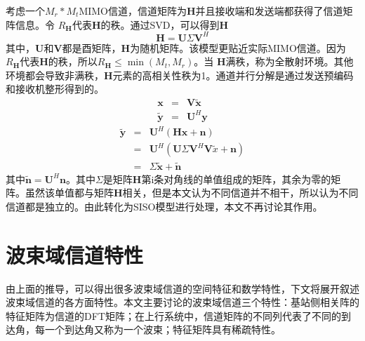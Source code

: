 \documentclass[bachelor,nocolorlinks, printoneside]{seuthesis} %
\begin{document}
\begin{Main}
考虑一个$ M_{r}* M_{t}$MIMO信道，信道矩阵为$\mathbf{H}$并且接收端和发送端都获得了信道矩阵信息。令 $ R_{\mathbf{H}}$代表$\mathbf{H}$的秩。通过SVD，可以得到$\mathbf{H}$
\begin{equation}\label{key}
\mathbf{H}=\mathbf{U}\Sigma\mathbf{V}^{H}
\end{equation}
其中，$\mathbf{U} $和$\mathbf{V} $都是酉矩阵，$\mathbf{H}$为随机矩阵。该模型更贴近实际MIMO信道。因为$ R_{\mathbf{H}}$代表$\mathbf{H}$的秩，所以$ R_{\mathbf{H}} \leq \min(M_{t},M_{r})$。当
$\mathbf{H}$满秩，称为全散射环境。其他环境都会导致非满秩，$\mathbf{H}$元素的高相关性秩为1。通道并行分解是通过发送预编码和接收机整形得到的。
\begin{eqnarray}\label{key}
\mathbf{x} &=& \mathbf{V}\tilde{\mathbf{x}}  \nonumber\\
\tilde{\mathbf{y}}&=& \mathbf{U}^{H}\mathbf{y}  \nonumber
\end{eqnarray}
\begin{eqnarray}\label{key}
\tilde{\mathbf{y}} & = &\mathbf{U}^{H}(\mathbf{H}\mathbf{x}+\mathbf{n}) {} \nonumber\\
& = & \mathbf{U}^{H}(\mathbf{U}\Sigma\mathbf{V}^{H}\mathbf{V}\tilde{x}+\mathbf{n}) \nonumber \\
& = & \Sigma\tilde{\mathbf{x}} + \tilde{\mathbf{n}}
\end{eqnarray}
其中$\tilde{\mathbf{n}}=\mathbf{U}^{H}\mathbf{n}$。其中$\Sigma$是矩阵$ \mathbf{H}$第i条对角线的单值组成的矩阵，其余为零的矩阵。虽然该单值都与矩阵$ \mathbf{H}$相关，但是本文认为不同信道并不相干，所以认为不同信道都是独立的。由此转化为SISO模型进行处理，本文不再讨论其作用。



\section{波束域信道特性}
由上面的推导，可以得出很多波束域信道的空间特征和数学特性，下文将展开叙述波束域信道的各方面特性。本文主要讨论的波束域信道三个特性：基站侧相关阵的特征矩阵为信道的DFT矩阵；在上行系统中，信道矩阵的不同列代表了不同的到达角，每一个到达角又称为一个波束；特征矩阵具有稀疏特性。\cite{SunboAngle}\cite{Youli1}\cite{Youli2}


\end{Main}
\end{document}
